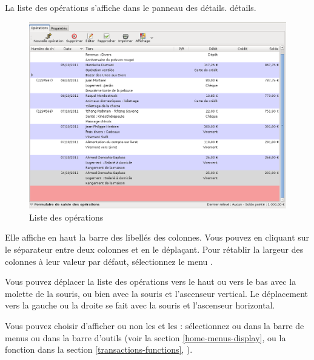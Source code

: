 La liste des opérations s'affiche dans le panneau des \ifIllustration détails.
\else détails.
\fi

\ifIllustration 
\begin{figure}[ht]
\begin{center}
\includegraphics[scale=0.5]{image/screenshot/transactions_list}
\end{center}
\caption{Liste des opérations}
\label{transactions-list-img}
\end{figure}
\fi

Elle affiche en haut la barre des libellés des colonnes. Vous pouvez  en cliquant sur le séparateur entre deux colonnes et en le déplaçant. Pour rétablir la largeur des colonnes à leur valeur par défaut, sélectionnez le menu .

Vous pouvez déplacer la liste des opérations vers le haut ou vers le bas avec la molette de la souris, ou bien avec la souris et l'ascenseur vertical. Le déplacement vers la gauche ou la droite se fait avec la souris et l'ascenseur horizontal.

Vous pouvez choisir d'afficher ou non les  et les  : sélectionnez  ou  dans la barre de menus ou dans la barre d'outils (voir la section \vref{home-menus-display},  ou la fonction  dans la section \vref{transactions-functions}, ).

